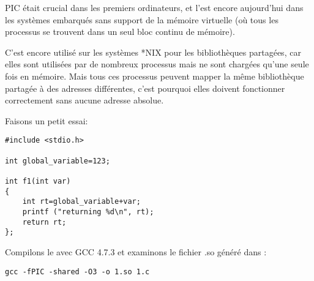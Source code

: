 \ac{PIC} était crucial dans les premiers ordinateurs, et l'est encore aujourd'hui dans les systèmes embarqués
sans support de la mémoire virtuelle (où tous les processus se trouvent dans un seul bloc continu de mémoire).

C'est encore utilisé sur les systèmes *NIX pour les bibliothèques partagées, car elles
sont utilisées par de nombreux processus mais ne sont chargées qu'une seule fois en mémoire.
Mais tous ces processus peuvent mapper la même bibliothèque partagée à des adresses différentes,
c'est pourquoi elles doivent fonctionner correctement sans aucune adresse absolue.


Faisons un petit essai:

\begin{lstlisting}
#include <stdio.h>

int global_variable=123;

int f1(int var)
{
    int rt=global_variable+var;
    printf ("returning %d\n", rt);
    return rt;
};
\end{lstlisting}

Compilons le avec GCC 4.7.3 et examinons le fichier .so généré dans \IDA:

\begin{lstlisting}
gcc -fPIC -shared -O3 -o 1.so 1.c
\end{lstlisting}


